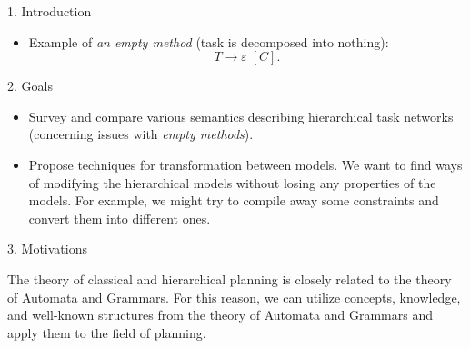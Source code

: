 \documentclass[portrait,a0paper,fontscale=0.25]{baposter}
\begin{document}
\begin{poster}
\begin{posterbox}[column=0,name=intro]{1. Introduction}
\begin{itemize}
    \item Example of \emph{an empty method} (task is decomposed into nothing):
    $$ T \rightarrow \varepsilon \; [C].$$
\end{itemize}

\end{posterbox}

\begin{posterbox}[column=0, name=goals, below=intro, headerColorOne=cyan!60, boxColorOne=cyan!20]{2. Goals}

\begin{itemize}
    \item Survey and compare various semantics describing hierarchical task networks (concerning issues with \emph{empty methods}).

    \item Propose techniques for transformation between models. We want to find ways of modifying the hierarchical models without losing any properties of the models. For example, we might try to compile away some constraints and convert them into different ones.
\end{itemize}

\end{posterbox}

\begin{posterbox}[column=0, name=motivation, below=goals]{3. Motivations}

The theory of classical and hierarchical planning is closely related to the theory of Automata and Grammars. For this reason, we can utilize concepts, knowledge, and well-known structures from the theory of Automata and Grammars and apply them to the field of planning.

\end{posterbox}

%
%



%
%
%


\end{poster}
\end{document}
